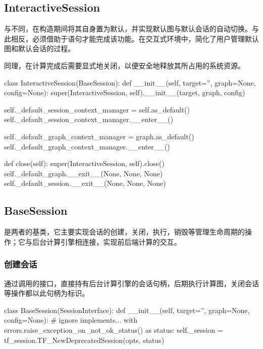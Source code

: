 \begin{content}
\subsection{InteractiveSession}

与不同，在构造期间将其自身置为默认，并实现默认图与默认会话的自动切换。与此相反，必须借助于语句才能完成该功能。在交互式环境中，简化了用户管理默认图和默认会话的过程。

同理，在计算完成后需要显式地关闭，以便安全地释放其所占用的系统资源。

\begin{leftbar}
\begin{python}
class InteractiveSession(BaseSession):
  def __init__(self, target='', graph=None, config=None):
    super(InteractiveSession, self).__init__(target, graph, config)

    self._default_session_context_manager = self.as_default()
    self._default_session_context_manager.__enter__()

    self._default_graph_context_manager = graph.as_default()
    self._default_graph_context_manager.__enter__()

  def close(self):
    super(InteractiveSession, self).close()
    self._default_graph.__exit__(None, None, None)
    self._default_session.__exit__(None, None, None)
\end{python}
\end{leftbar}

\subsection{BaseSession}

是两者的基类，它主要实现会话的创建，关闭，执行，销毁等管理生命周期的操作；它与后台计算引擎相连接，实现前后端计算的交互。

\subsubsection{创建会话}

通过调用的接口，直接持有后台计算引擎的会话句柄，后期执行计算图，关闭会话等操作都以此句柄为标识。

\begin{leftbar}
\begin{python}
class BaseSession(SessionInterface):
  def __init__(self, target='', graph=None, config=None):
    # ignore implements...
    with errors.raise_exception_on_not_ok_status() as status:
      self._session = 
        tf_session.TF_NewDeprecatedSession(opts, status)
\end{python}
\end{leftbar}


\end{content}

